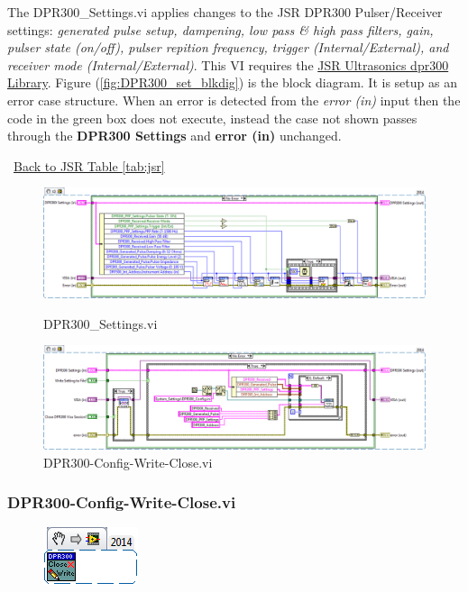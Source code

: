 \documentclass[11pt,a4paper,oldfontcommands]{memoir}
\begin{document}
The DPR300\_Settings.vi applies changes to the JSR DPR300 Pulser/Receiver settings: \textit{generated pulse setup, dampening, low pass \& high pass filters, gain, pulser state (on/off), pulser repition frequency, trigger (Internal/External), and receiver mode (Internal/External)}. This VI requires the \href{http://sine.ni.com/apps/utf8/niid_web_display.download_page?p_id_guid=EE0D9BE18DD85923E0340003BA7CCD71}{JSR Ultrasonics dpr300 Library}. Figure (\ref{fig:DPR300_set_blkdig}) is the block diagram.  It is setup as an error case structure. When an error is detected from the \textit{error (in)} input then the code in the green box does not execute, instead the case not shown passes through the \textbf{DPR300 Settings} and \textbf{error (in)} unchanged.

\noindent\hrulefill\, \hyperref[tab:jsr]{Back to JSR Table \ref{tab:jsr}}

\begin{figure}
	\includegraphics[width=\textheight,keepaspectratio]{DPR300_settings_blockdiagram_01}
	\caption{DPR300\_Settings.vi}
	\label{fig:DPR300_set_blkdig}
	\includegraphics[width=\textheight,keepaspectratio]{DPR300-Config-Write-Close_blockdiagram_01}
	\caption{DPR300-Config-Write-Close.vi}
	\label{fig:DPR300_cwc_blkdig}
\end{figure}

\subsubsection{DPR300-Config-Write-Close.vi} \label{DPR300_cwc}
\noindent\hrulefill

\begin{figure}[h]
	\includegraphics[scale=0.625]{DPR300-Config-Write-Close_main_01}
	\label{fig:DPR300-Config-Write-Close_main_01}
\end{figure}
\end{document}
